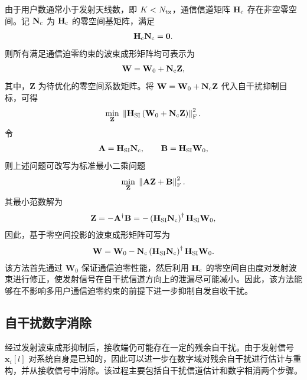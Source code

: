 \documentclass[onecolumn,10pt]{IEEEtran}
\begin{document}
由于用户数通常小于发射天线数，即 $K<N_{\rm tx}$，通信信道矩阵 $\mathbf{H}_{\rm c}$ 存在非空零空间。记 $\mathbf{N}_{\rm c}$ 为 $\mathbf{H}_{\rm c}$ 的零空间基矩阵，满足
\begin{align}
    \mathbf{H}_{\rm c}\mathbf{N}_{\rm c} = \mathbf{0}.
\end{align}
则所有满足通信迫零约束的波束成形矩阵均可表示为
\begin{align}
    \mathbf{W}
    =
    \mathbf{W}_0
    +
    \mathbf{N}_{\rm c}\mathbf{Z},
\end{align}
其中，$\mathbf{Z}$ 为待优化的零空间系数矩阵。将 $\mathbf{W}=\mathbf{W}_0+\mathbf{N}_{\rm c}\mathbf{Z}$ 代入自干扰抑制目标，可得
\begin{align}
    \min_{\mathbf{Z}}\;
    \left\lVert
    \mathbf{H}_{\rm SI}\left( \mathbf{W}_0+\mathbf{N}_{\rm c}\mathbf{Z} \right)
    \right\rVert_{\rm F}^2.
\end{align}
令
\begin{align}
    \mathbf{A} = \mathbf{H}_{\rm SI}\mathbf{N}_{\rm c},
    \qquad
    \mathbf{B} = \mathbf{H}_{\rm SI}\mathbf{W}_0,
\end{align}
则上述问题可改写为标准最小二乘问题
\begin{align}
    \min_{\mathbf{Z}}\;
    \left\lVert \mathbf{A}\mathbf{Z}+\mathbf{B} \right\rVert_{\rm F}^2.
\end{align}
其最小范数解为
\begin{align}
    \mathbf{Z}
    =
    -\mathbf{A}^{\dagger}\mathbf{B}
    =
    -\left( \mathbf{H}_{\rm SI}\mathbf{N}_{\rm c} \right)^{\dagger}
    \mathbf{H}_{\rm SI}\mathbf{W}_0,
\end{align}
因此，基于零空间投影的波束成形矩阵可写为
\begin{align}
    \mathbf{W}
    =
    \mathbf{W}_0
    -
    \mathbf{N}_{\rm c}
    \left( \mathbf{H}_{\rm SI}\mathbf{N}_{\rm c} \right)^{\dagger}
    \mathbf{H}_{\rm SI}\mathbf{W}_0.
\end{align}
该方法首先通过 $\mathbf{W}_0$ 保证通信迫零性能，然后利用 $\mathbf{H}_{\rm c}$ 的零空间自由度对发射波束进行修正，使发射信号在自干扰信道方向上的泄漏尽可能减小。因此，该方法能够在不影响多用户通信迫零约束的前提下进一步抑制自发自收干扰。

\subsection{自干扰数字消除}

经过发射波束成形抑制后，接收端仍可能存在一定的残余自干扰。由于发射信号 $\mathbf{x}_i[l]$ 对系统自身是已知的，因此可以进一步在数字域对残余自干扰进行估计与重构，并从接收信号中消除。该过程主要包括自干扰信道估计和数字相消两个步骤。
\end{document}
